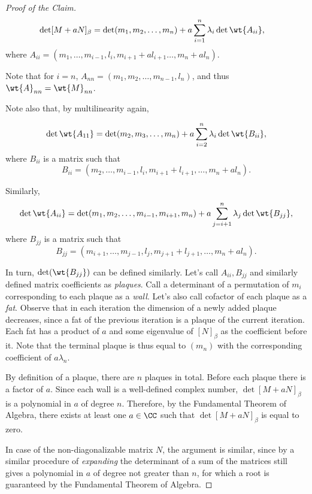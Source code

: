 \documentclass[11pt]{scrartcl}
\begin{document}
\begin{linenumbers}
\begin{proof}[Proof of the Claim]
    \begin{align*}
      \det [M+aN]_{\beta} & = \det(m_1, m_2,\dots, m_n) + a\sum_{i=1}^{n}\lambda_{i}\det\wt{A_{ii}},
    \end{align*}
    where $A_{ii} = (m_1,\dots, m_{i-1}, l_i, m_{i+1}+al_{i+1}\dots, m_n+al_{n})$.

    Note that for $i = n$, $A_{nn} = (m_1,m_2,\dots,m_{n-1}, l_{n})$, and thus $\wt{A}_{nn} = \wt{M}_{nn}$.

    Note also that, by multilinearity again,

    \[\det\wt{A_{11}} = \det(m_2, m_3,\dots, m_n) +
      a\sum_{i=2}^{n}\lambda_{i}\det\wt{B_{ii}},\]
    where $B_{ii}$ is a matrix such that
    \[B_{ii} = (m_2,\dots, m_{i-1}, l_i, m_{i+1}+l_{i+1},\dots,
      m_n+al_{n}).\]

    Similarly,
    \[\det\wt{A_{ii}} = \det(m_1, m_2,\dots, m_{i-1}, m_{i+1}, m_n) +
      a\sum_{j=i+1}^{n}\lambda_{j}\det\wt{B_{jj}},\] where $B_{jj}$ is a
    matrix such that
    \[B_{jj} = (m_{i+1},\dots, m_{j-1}, l_j, m_{j+1}+l_{j+1},\dots,
      m_n+al_{n}).\]

    In turn, $\det(\wt{B_{jj}})$ can be defined similarly. Let's call
    $A_{ii}, B_{jj}$ and similarly defined matrix coefficients as
    \textit{plaques}. Call a determinant of a permutation of $m_{i}$
    corresponding to each plaque as a \textit{wall}. Let's also call
    cofactor of each plaque as a \textit{fat}. Observe that in each
    iteration the dimension of a newly added plaque decreases, since a
    fat of the previous iteration is a plaque of the current
    iteration. Each fat has a product of $a$ and some eigenvalue of
    $[N]_{\beta}$ as the coefficient before it. Note that the terminal
    plaque is thus equal to $(m_{n})$ with the corresponding
    coefficient of $a\lambda_{n}$.

    By definition of a plaque, there are $n$ plaques in total. Before
    each plaque there is a factor of $a$. Since each wall is a
    well-defined complex number, $ \det [M+aN]_{\beta}$ is a
    polynomial in $a$ of degree $n$. Therefore, by the Fundamental
    Theorem of Algebra, there exists at least one $a\in \CC$ such that
    $ \det [M+aN]_{\beta}$ is equal to zero.

    In case of the non-diagonalizable matrix $N$, the argument is
    similar, since by a similar procedure of \textit{expanding} the
    determinant of a sum of the matrices still gives a polynomial in
    $a$ of degree not greater than $n$, for which a root is guaranteed
    by the Fundamental Theorem of Algebra.
  \end{proof}


\end{linenumbers}
\end{document}
